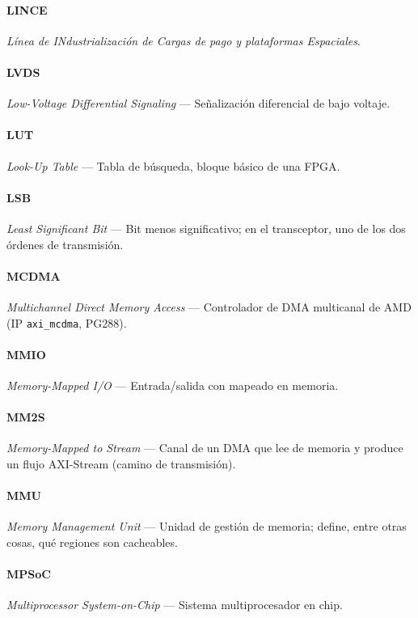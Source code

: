 \paragraph{LINCE} \textit{Línea de INdustrialización de Cargas de pago y plataformas Espaciales}.

\paragraph{LVDS} \textit{Low-Voltage Differential Signaling} --- Señalización diferencial de bajo voltaje.

\paragraph{LUT} \textit{Look-Up Table} --- Tabla de búsqueda, bloque básico de una FPGA.

\paragraph{LSB} \textit{Least Significant Bit} --- Bit menos significativo; en el transceptor, uno de los dos órdenes de transmisión.

\paragraph{MCDMA} \textit{Multichannel Direct Memory Access} --- Controlador de DMA multicanal de AMD (IP \texttt{axi\_mcdma}, PG288).

\paragraph{MMIO} \textit{Memory-Mapped I/O} --- Entrada/salida con mapeado en memoria.

\paragraph{MM2S} \textit{Memory-Mapped to Stream} --- Canal de un DMA que lee de memoria y produce un flujo AXI-Stream (camino de transmisión).

\paragraph{MMU} \textit{Memory Management Unit} --- Unidad de gestión de memoria; define, entre otras cosas, qué regiones son cacheables.

\paragraph{MPSoC} \textit{Multiprocessor System-on-Chip} --- Sistema multiprocesador en chip.

